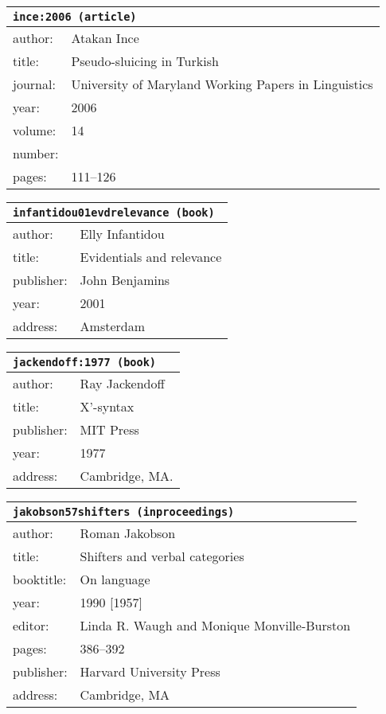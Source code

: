 \documentclass{article}
\begin{document}
\bigskip

\begin{tabular}{p{}p{}}
\multicolumn{2}{l}{\texttt{ince:2006 (article)}}\\
\hline
author: & Atakan Ince\\
title: & Pseudo-sluicing in Turkish\\
journal: & University of Maryland Working Papers in Linguistics\\
year: & 2006\\
volume: & 14\\
number: & \\
pages: & 111--126\\
\end{tabular}

\bigskip

\begin{tabular}{p{}p{}}
\multicolumn{2}{l}{\texttt{infantidou01evdrelevance (book)}}\\
\hline
author: & Elly Infantidou\\
title: & Evidentials and relevance\\
publisher: & John Benjamins\\
year: & 2001\\
address: & Amsterdam\\
\end{tabular}

\bigskip

\begin{tabular}{p{}p{}}
\multicolumn{2}{l}{\texttt{jackendoff:1977 (book)}}\\
\hline
author: & Ray Jackendoff\\
title: & X'-syntax\\
publisher: & MIT Press\\
year: & 1977\\
address: & Cambridge, MA.\\
\end{tabular}

\bigskip

\begin{tabular}{p{}p{}}
\multicolumn{2}{l}{\texttt{jakobson57shifters (inproceedings)}}\\
\hline
author: & Roman Jakobson\\
title: & Shifters and verbal categories\\
booktitle: & On language\\
year: & 1990 [1957]\\
editor: & Linda R. Waugh and Monique Monville-Burston\\
pages: & 386--392\\
publisher: & Harvard University Press\\
address: & Cambridge, MA\\
\end{tabular}
\end{document}
